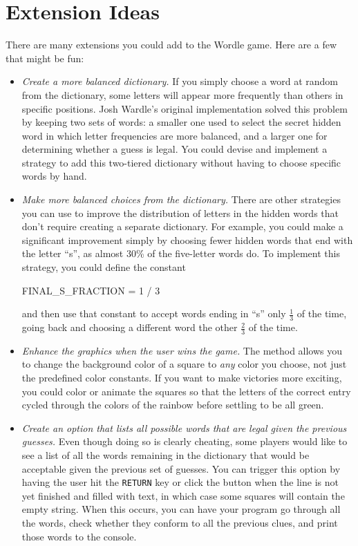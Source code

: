 \documentclass[letterpaper,12pt]{exam}
\begin{document}
\section{Extension Ideas}
There are many extensions you could add to the Wordle game. Here are a few that might be fun:
\begin{itemize}
	\item \emph{Create a more balanced dictionary.} If you simply choose a word at random from the dictionary, some letters will appear more frequently than others in specific positions. Josh Wardle's original implementation solved this problem by keeping two sets of words: a smaller one used to select the secret hidden word in which letter frequencies are more balanced, and a larger one for determining whether a guess is legal. You could devise and implement a strategy to add this two-tiered dictionary without having to choose specific words by hand.
	\item \emph{Make more balanced choices from the dictionary.} There are other strategies you can use to improve the distribution of letters in the hidden words that don't require creating a separate dictionary. For example, you could make a significant improvement simply by choosing fewer hidden words that end with the letter ``s'', as almost 30\% of the five-letter words do. To implement this strategy, you could define the constant
		\begin{pythoncode}
			FINAL_S_FRACTION = 1 / 3
		\end{pythoncode}
		and then use that constant to accept words ending in ``s'' only $\tfrac{1}{3}$ of the time, going back and choosing a different word the other $\tfrac{2}{3}$ of the time.
	\item \emph{Enhance the graphics when the user wins the game.} The  method allows you to change the background color of a square to \emph{any} color you choose, not just the predefined color constants. If you want to make victories more exciting, you could color or animate the squares so that the letters of the correct entry cycled through the colors of the rainbow before settling to be all green.
	\item \emph{Create an option that lists all possible words that are legal given the previous guesses.} Even though doing so is clearly cheating, some players would like to see a list of all the words remaining in the dictionary that would be acceptable given the previous set of guesses. You can trigger this option by having the user hit the \texttt{RETURN} key or click the  button when the line is not yet finished and filled with text, in which case some squares will contain the empty string. When this occurs, you can have your program go through all the words, check whether they conform to all the previous clues, and print those words to the console.

\end{itemize}
\end{document}
